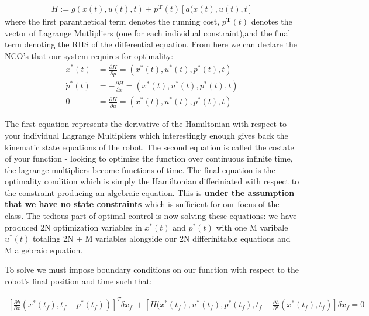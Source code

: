 \documentclass[twoside]{article}
\begin{document}
\begin{equation} \label{hamiltonian}
\begin{split}
H := g(x(t), u(t), t) + p^\textbf{T}(t)[a(x(t), u(t), t]
\end{split}
\end{equation}
where the first paranthetical term denotes the running cost, $p^\textbf{T}(t)$ denotes the vector of Lagrange Mutlipliers (one for each individual constraint),and the final term denoting the RHS of the differential equation. 
From here we can declare the NCO's that our system requires for optimality: 
\begin{equation} \label{hamiltonianNCOs}
\begin{split}
\dot{x}^*(t) &= \frac{\partial{H}}{\partial{p}} = (x^*(t), u^*(t), p^*(t), t)\\
\dot{p}^*(t) &= -\frac{\partial{H}}{\partial{x}} = (x^*(t), u^*(t), p^*(t), t)\\
0 &= \frac{\partial{H}}{\partial{u}} = (x^*(t), u^*(t), p^*(t), t)
\end{split}
\end{equation}

The first equation represents the derivative of the Hamiltonian with respect to your individual Lagrange Multipliers which interestingly enough gives back the kinematic state equations of the robot. The second equation is called the costate of your function - looking to optimize the function over continuous infinite time, the lagrange multipliers become functions of time. The final equation is the optimality condition which is simply the Hamiltonian differiniated with respect to the constraint producing an algebraic equation. This is \textbf{under the assumption that we have no state constraints} which is sufficient for our focus of the class. The tedious part of optimal control is now solving these equations: we have produced 2N optimization variables in $x^*(t)$ and $p^*(t)$ with one M varibale $u^*(t)$ totaling 2N + M variables alongside our 2N differinitable equations and M algebraic equation. 

To solve we must impose boundary conditions on our function with respect to the robot's final position and time such that: 

\begin{equation} \label{hamiltonianBCs}
\begin{split}
[\frac{\partial{h}}{\partial{x}}(x^*(t_f), t_f - p^*(t_f))]^T\delta{x_f}\ + [H(x^*(t_f), u^*(t_f), p^*(t_f), t_f + \frac{\partial{h}}{\partial{t}}(x^*(t_f), t_f)]\delta{x_f} = 0\\
\end{split}
\end{equation}
\end{document}
